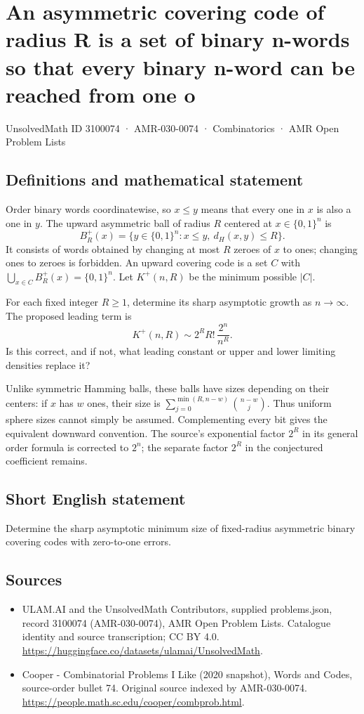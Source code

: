 \documentclass[11pt,a4paper]{article}
\begin{document}
\section*{An asymmetric covering code of radius R is a set of binary n-words so that every binary n-word can be reached from one o}\label{3100074}
{\small UnsolvedMath ID 3100074 · AMR-030-0074 · Combinatorics · AMR Open Problem Lists}
\subsection{Definitions and mathematical statement}
Order binary words coordinatewise, so $x\le y$ means that every
one in $x$ is also a one in $y$. The upward asymmetric ball of
radius $R$ centered at $x\in\{0,1\}^n$ is
\[
 B_R^+(x)=\{y\in\{0,1\}^n:x\le y,\ d_H(x,y)\le R\}.
\]
It consists of words obtained by changing at most $R$ zeroes
of $x$ to ones; changing ones to zeroes is forbidden.
An upward covering code is a set $C$ with
$\bigcup_{x\in C}B_R^+(x)=\{0,1\}^n$. Let $K^+(n,R)$ be the
minimum possible $|C|$.

For each fixed integer $R\ge1$, determine its sharp asymptotic
growth as $n\to\infty$. The proposed leading term is
\[
                K^+(n,R)\sim 2^R R!\,\frac{2^n}{n^R}.
\]
Is this correct, and if not, what leading constant or upper and
lower limiting densities replace it?

Unlike symmetric Hamming balls, these balls have sizes depending
on their centers: if $x$ has $w$ ones, their size is
$\sum_{j=0}^{\min(R,n-w)}\binom{n-w}{j}$. Thus uniform sphere
sizes cannot simply be assumed. Complementing every bit gives
the equivalent downward convention. The source's exponential
factor $2^R$ in its general order formula is corrected to $2^n$;
the separate factor $2^R$ in the conjectured coefficient remains.
\subsection{Short English statement}
Determine the sharp asymptotic minimum size of fixed-radius asymmetric binary covering codes with zero-to-one errors.
\subsection{Sources}
\begin{itemize}
\item[S1] ULAM.AI and the UnsolvedMath Contributors, supplied problems.json, record 3100074 (AMR-030-0074), AMR Open Problem Lists. Catalogue identity and source transcription; CC BY 4.0.
\url{https://huggingface.co/datasets/ulamai/UnsolvedMath}.
\item[S2] Cooper - Combinatorial Problems I Like (2020 snapshot), Words and Codes, source-order bullet 74. Original source indexed by AMR-030-0074.
\url{https://people.math.sc.edu/cooper/combprob.html}.
\end{itemize}
\end{document}
